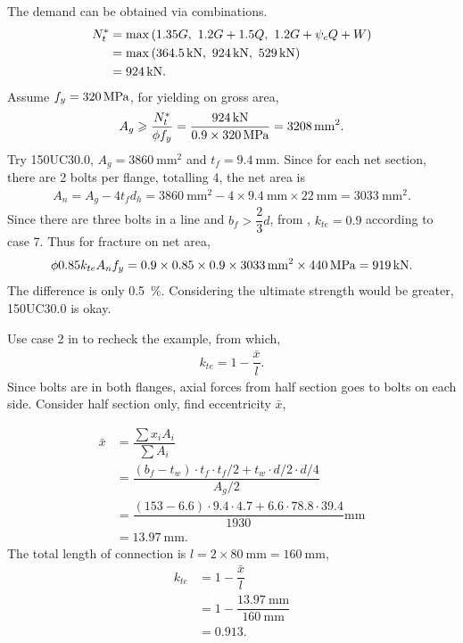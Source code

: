 \begin{solution}
The demand can be obtained via combinations.
\begin{align*}
N^*_t&=\max\left(1.35G,~1.2G+1.5Q,~1.2G+\psi_cQ+W\right)\\
&=\max\left(\SI{364.5}{\kilo\newton},~\SI{924}{\kilo\newton},~\SI{529}{\kilo\newton}\right)\\
&=\SI{924}{\kilo\newton}.
\end{align*}
Assume $f_y=\SI{320}{\mega\pascal}$, for yielding on gross area,
\begin{gather*}
A_g\geqslant\dfrac{N^*_t}{\phi{}f_y}=\dfrac{\SI{924}{\kilo\newton}}{0.9\times\SI{320}{\mega\pascal}}=\SI{3208}{\milli\meter^2}.
\end{gather*}
Try 150UC30.0, $A_g=\SI{3860}{\mm^2}$ and $t_f=\SI{9.4}{\mm}$. Since for each net section, there are 2 bolts per flange, totalling 4, the net area is
\begin{gather*}
A_n=A_g-4t_fd_h=\SI{3860}{\mm^2}-4\times\SI{9.4}{\mm}\times\SI{22}{\mm}=\SI{3033}{\mm^2}.
\end{gather*}
Since there are three bolts in a line and $b_f>\dfrac{2}{3}d$, from , $k_{te}=0.9$ according to case 7. Thus for fracture on net area,
\begin{gather*}
\phi0.85k_{te}A_nf_y=0.9\times0.85\times0.9\times\SI{3033}{\milli\meter^2}\times\SI{440}{\mega\pascal}=\SI{919}{\kilo\newton}.
\end{gather*}
The difference is only \SI{0.5}{\percent}. Considering the ultimate strength would be greater, 150UC30.0 is okay.

Use case 2 in  to recheck the example, from which,
\begin{gather*}
k_{te}=1-\dfrac{\bar{x}}{l}.
\end{gather*}
Since bolts are in both flanges, axial forces from half section goes to bolts on each side. Consider half section only, find eccentricity $\bar{x}$,

\begin{minipage}{6cm}
\centering
\end{minipage}
\begin{minipage}{.99\linewidth-6cm}
\begin{align*}
\bar{x}&=\dfrac{\sum{}x_iA_i}{\sum{}A_i}\\&=\dfrac{\left(b_f-t_w\right)\cdot{}t_f\cdot{}t_f/2+t_w\cdot{}d/2\cdot{}d/4}{A_g/2}\\
&=\dfrac{\left(153-6.6\right)\cdot{}9.4\cdot{}4.7+6.6\cdot{}78.8\cdot{}39.4}{1930}\si{\mm}\\
&=\SI{13.97}{\mm}.
\end{align*}
The total length of connection is $l=2\times\SI{80}{\mm}=\SI{160}{\mm}$,
\begin{align*}
k_{te}&=1-\dfrac{\bar{x}}{l}\\
&=1-\dfrac{\SI{13.97}{\mm}}{\SI{160}{\mm}}\\
&=0.913.
\end{align*}
\end{minipage}


\end{solution}
